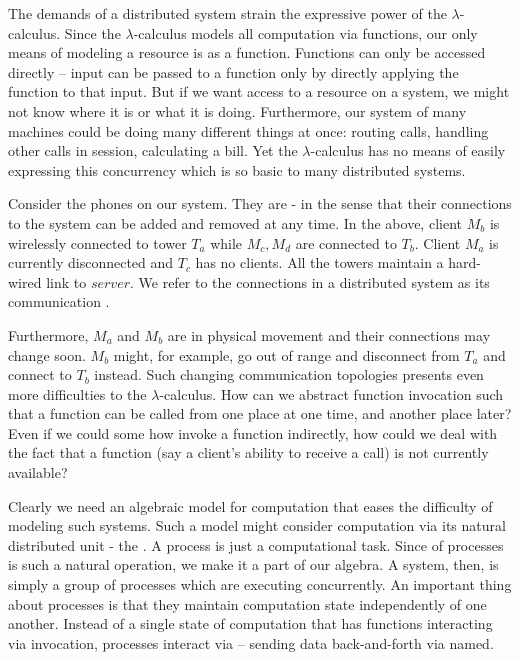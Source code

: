 The demands of a distributed system strain the expressive power of the $\lambda$-calculus.  Since the $\lambda$-calculus models all computation via functions, our only means of modeling a resource is as a function.  Functions can only be accessed directly -- input can be passed to a function only by directly applying the function to that input.  But if we want access to a resource on a system, we might not know where it is or what it is doing.  Furthermore, our system of many machines could be doing many different things at once: routing calls, handling other calls in session, calculating a bill.  Yet the $\lambda$-calculus has no means of easily expressing this concurrency which is so basic to many distributed systems.


Consider the phones on our system.  They are\emph{} - in the sense that their connections to the system can be added and removed at any time.  In the  above, client $M_b$ is wirelessly connected to tower $T_a$ while $M_c,M_d$ are connected to $T_b$.  Client $M_a$ is currently disconnected and $T_c$ has no clients.  All the towers maintain a hard-wired link to $server$.  We refer to the connections in a distributed system as its communication .

Furthermore, $M_a$ and $M_b$ are in physical movement and their connections may change soon.  $M_b$ might, for example, go out of range and disconnect from $T_a$ and connect to $T_b$ instead.  Such changing communication topologies presents even more difficulties to the $\lambda$-calculus.  How can we abstract function invocation such that a function can be called from one place at one time, and another place later?  Even if we could some how invoke a function indirectly, how could we deal with the fact that a function (say a client's ability to receive a call) is not currently available?

Clearly we need an algebraic model for computation that eases the difficulty of modeling such systems.  Such a model might consider computation via its natural distributed unit - the .  A process is just a computational task.  Since  of processes is such a natural operation, we make it a part of our algebra.  A system, then, is simply a group of processes which are executing concurrently. An important thing about processes is that they maintain computation state independently of one another.  Instead of a single state of computation that has functions interacting via invocation, processes interact via  -- sending data back-and-forth via named.  

